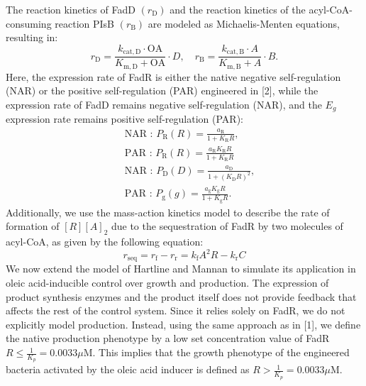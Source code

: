 \documentclass[UTF8]{article}
\begin{document}
The reaction kinetics of FadD $\left(r_{\mathrm{D}}\right)$ and the reaction kinetics of the acyl-CoA-consuming reaction PIsB $\left(r_{\mathrm{B}}\right)$ are modeled as Michaelis-Menten equations, resulting in:
\begin{equation}
r_{\mathrm{D}}=\frac{k_{\mathrm{cat}, \mathrm{D}} \cdot \mathrm{OA}}{K_{\mathrm{m}, \mathrm{D}}+\mathrm{OA}} \cdot D, \quad r_{\mathrm{B}}=\frac{k_{\mathrm{cat}, \mathrm{B}} \cdot A}{K_{\mathrm{m}, \mathrm{B}}+A} \cdot B .
\end{equation}
Here, the expression rate of FadR is either the native negative self-regulation (NAR) or the positive self-regulation (PAR) engineered in [2], while the expression rate of FadD remains negative self-regulation (NAR), and the $E_g$ expression rate remains positive self-regulation (PAR):
\begin{equation}
\begin{aligned}
	& \text { NAR : } P_{\mathrm{R}}(R)=\frac{a_{\mathrm{R}}}{1+K_{\mathrm{R}} R}, \\
	& \text { PAR : } P_{\mathrm{R}}(R)=\frac{a_{\mathrm{R}} K_{\mathrm{R}} R}{1+K_{\mathrm{R}} R} \\
	& \text { NAR : } P_{\mathrm{D}}(D)=\frac{a_{\mathrm{D}}}{1+\left(K_{\mathrm{D}} R\right)^2}, \\
	& \text { PAR : } P_{\mathrm{g}}(g)=\frac{a_{\mathrm{g}} K_{\mathrm{g}} R}{1+K_{\mathrm{g}} R} .
\end{aligned}
\end{equation}
Additionally, we use the mass-action kinetics model to describe the rate of formation of $[R][A]_2$ due to the sequestration of FadR by two molecules of acyl-CoA, as given by the following equation:
\begin{equation}
r_{\mathrm{seq}}=r_{\mathrm{f}}-r_{\mathrm{r}}=k_{\mathrm{f}} A^2 R-k_{\mathrm{r}} C
\end{equation}
We now extend the model of Hartline and Mannan to simulate its  application in oleic acid-inducible control over growth and production.  The expression of product synthesis enzymes and the product itself does  not provide feedback that affects the rest of the control system. Since  it relies solely on FadR, we do not explicitly model production.  Instead, using the same approach as in [1], we define the native  production phenotype by a low set concentration value of FadR $R \leq  \frac{1}{K_p} = 0.0033 \mu \mathrm{M}$.  This implies that the growth phenotype of the engineered bacteria activated by the oleic acid inducer is defined as $R>  \frac{1}{K_p} = 0.0033 \mu \mathrm{M}$.
\end{document}
